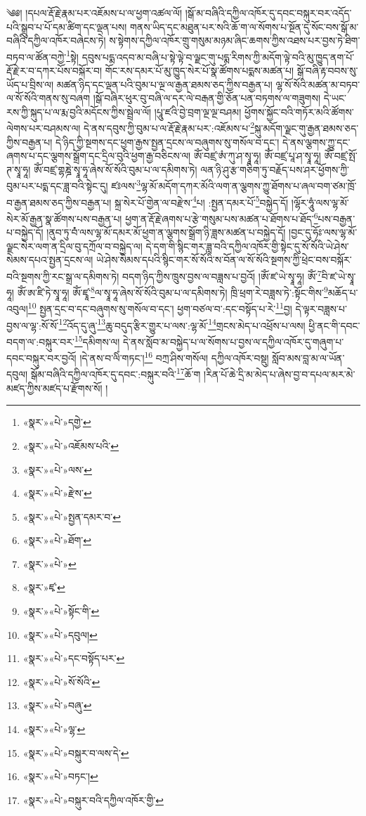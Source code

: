༄༅། །དཔལ་རྡོ་རྗེ་རྣམ་པར་འཇོམས་པ་ལ་ཕྱག་འཚལ་ལོ། །སྒོ་མ་བཞིའི་དཀྱིལ་འཁོར་དུ་དབང་བསྐུར་བར་འདོད་པའི་སྒྲུབ་པ་པོ་དམ་ཚིག་དང་ལྡན་པས། གནས་ཡིད་དང་མཐུན་པར་སའི་ཆོ་ག་ལ་སོགས་པ་སྔོན་དུ་སོང་བས་སྒོ་མ་བཞིའི་དཀྱིལ་འཁོར་བཞེངས་ཏེ། ས་སྟེགས་དཀྱིལ་འཁོར་གྲུ་གསུམ་མཉམ་ཞིང་ཆགས་ཀྱིས་འཐས་པར་བྱས་ཏེ་ཐིག་བཏབ་ལ་ཚོན་བཀྱེ་\footnote{«སྣར་»«པེ་»དགྱེ་}སྟེ། དབུས་པདྨ་འདབ་མ་བཞི་པ་སྟེ་ལྟེ་བ་ལྗང་གུ་པདྨ་རིགས་ཀྱི་མདོག་ལྟེ་བའི་མུ་ཁྱུད་ནག་པོ་རྡོ་རྗེ་ར་བ་དཀར་པོས་བསྐོར་བ། གོང་རས་དམར་པོ་མུ་ཁྱུད་སེར་པོ་སྣ་ཚོགས་པདྨས་མཚན་པ། སྒོ་བཞི་རྟ་བབས་སུ་ཡོད་པ་བྲིས་ལ། མཚན་ཉིད་དང་ལྡན་པའི་བུམ་པ་ལྔ་ལ་རྒྱན་ཐམས་ཅད་ཀྱིས་བརྒྱན་པ། ལྷ་སོ་སོའི་མཚན་མ་བཏབ་ལ་སོ་སོའི་གནས་སུ་བཞག །སྒོ་བཞིར་ཕུར་བུ་བཞི་ལ་དར་ལེ་བརྒན་གྱི་ཅོན་པན་བཏགས་ལ་གཟུགས། དེ་ཡང་རས་ཀྱི་སྐུད་པ་ལ་རྨ་བྱའི་མདོངས་ཀྱིས་སྦྲེལ་ལོ། །པཱུ་ཛའི་བྱེ་བྲག་ལྔ་ལྔ་བཤམ། ཕྱོགས་སྐྱོང་བའི་གཏོར་མའི་ཚོགས་ལེགས་པར་བཤམས་ལ། དེ་ནས་དབུས་ཀྱི་བུམ་པ་ལ་རྡོ་རྗེ་རྣམ་པར་:འཇོམས་པ་\footnote{«སྣར་»«པེ་»འཇོམས་པའི་}སྐུ་མདོག་ལྗང་གུ་རྒྱན་ཐམས་ཅད་ཀྱིས་བརྒྱན་པ། དེ་ཉིད་ཀྱི་སྔགས་དང་ཕྱག་རྒྱས་སྤྱན་དྲངས་ལ་བཞུགས་སུ་གསོལ་བ་དང་། དེ་ནས་ལྕགས་ཀྱུ་དང་ཞགས་པ་དང་ལྕགས་སྒྲོག་དང་དྲིལ་བུའི་ཕྱག་རྒྱ་བཅིངས་ལ། ཨོཾ་བཛྲ་ཨཾ་ཀུ་ཤ་སྭཱ་ཧཱ། ཨོཾ་བཛྲ་པཱ་ཤ་སྭཱ་ཧཱ། ཨོཾ་བཛྲ་སྤོ་ཊ་སྭཱ་ཧཱ། ཨོཾ་བཛྲ་གྷཎྜེ་སྭཱ་ཧཱ་ཞེས་སོ་སོའི་བུམ་པ་ལ་དམིགས་ཏེ། ལན་ཉི་ཤུ་རྩ་གཅིག་ཏུ་བརྗོད་པས་ཤར་ཕྱོགས་ཀྱི་བུམ་པར་པདྨ་དང་ཟླ་བའི་སྟེང་དུ། ཛཿལས་\footnote{«སྣར་»«པེ་»ལས་}ལྷ་མོ་མདོག་དཀར་མོའི་ལག་ན་ལྕགས་ཀྱུ་ཐོགས་པ་ཞལ་བག་ཙམ་ཁྲོ་བ་རྒྱན་ཐམས་ཅད་ཀྱིས་བརྒྱན་པ། སྐྲ་སེར་པོ་གྱེན་ལ་བརྫེས་\footnote{«སྣར་»«པེ་»རྫེས་}པ། :སྤྱན་དམར་པོ་\footnote{«སྣར་»«པེ་»སྤྱན་དམར་བ་}བསྐྱེད་དོ། །ལྷོར་ཧཱུཾ་ལས་ལྷ་མོ་སེར་མོ་རྒྱན་སྣ་ཚོགས་པས་བརྒྱན་པ། ཕྱག་ན་རྡོ་རྗེ་ཞགས་པ་རྩེ་གསུམ་པས་མཚན་པ་ཐོགས་པ་ཐོད་\footnote{«སྣར་»«པེ་»ཐོག་}པས་བརྒྱན་པ་བསྐྱེད་དོ། །ནུབ་ཏུ་བཾཾ་ལས་ལྷ་མོ་དམར་མོ་ཕྱག་ན་ལྕགས་སྒྲོག་ཉི་ཟླས་མཚན་པ་བསྐྱེད་དོ། །བྱང་དུ་ཧོཿ་ལས་ལྷ་མོ་ལྗང་སེར་ལག་ན་དྲིལ་བུ་དཀྲོལ་བ་བསྐྱེད་ལ། དེ་དག་གི་སྙིང་གར་ཟླ་བའི་དཀྱིལ་འཁོར་གྱི་སྟེང་དུ་སོ་སོའི་ཡེ་ཤེས་སེམས་དཔའ་སྤྱན་དྲངས་ལ། ཡེ་ཤེས་སེམས་དཔའི་སྙིང་གར་སོ་སོའི་ས་བོན་ལ་སོ་སོའི་སྔགས་ཀྱི་ཕྲེང་བས་བསྐོར་བའི་སྔགས་ཀྱི་རང་སྒྲ་ལ་དམིགས་ཏེ། བདག་ཉིད་ཀྱིས་ཁྲུས་བྱས་ལ་བཟླས་པ་བྱའོ། །ཨོཾ་ཛ་ཡེ་སྭཱ་ཧཱ། ཨོཾ་\footnote{«སྣར་»«པེ་»}བི་ཛ་ཡེ་སྭཱ་ཧཱ། ཨོཾ་ཨ་ཛི་ཏེ་སྭཱ་ཧཱ། ཨོཾ་ཛྭཱ་\footnote{«སྣར་»ཛྭ་}ལ་སྭཱ་ཧཱ་ཞེས་སོ་སོའི་བུམ་པ་ལ་དམིགས་ཏེ། ཁྲི་ཕྲག་རེ་བཟླས་ཏེ་:སྟོང་གིས་\footnote{«སྣར་»«པེ་»སྟོང་གི་}མཆོད་པ་འབུལ།\footnote{«སྣར་»«པེ་»དབུལ།} སྤྱན་དྲང་བ་དང་བཞུགས་སུ་གསོལ་བ་དང་། ཕྱག་བཙལ་བ་:དང་བསྟོད་པ་རེ་\footnote{«སྣར་»«པེ་»དང་བསྟོད་པར་}བྱ། དེ་ལྟར་བཟླས་པ་བྱས་ལ་ལྷ་:སོ་སོ་\footnote{«སྣར་»«པེ་»སོ་སོའི་}འོད་དུ་ཞུ་\footnote{«སྣར་»«པེ་»བཞུ་}ཆུ་བདུད་རྩིར་གྱུར་པ་ལས་:ལྷ་མོ་\footnote{«སྣར་»«པེ་»ལྷ་}གྲངས་མེད་པ་འཕྲོས་པ་ལས། ཕྱི་ནང་གི་དབང་བདག་ལ་:བསྐུར་བར་\footnote{«སྣར་»«པེ་»བསྐུར་བ་ལས་དེ་}དམིགས་ལ། དེ་ནས་སློབ་མ་བསྐྱེད་པ་ལ་སོགས་པ་བྱས་ལ་དཀྱིལ་འཁོར་དུ་གཞུག་པ་དབང་བསྐུར་བར་བྱའོ། །དེ་ནས་བ་ལིཾ་གཏང་།\footnote{«སྣར་»«པེ་»བཏང་།} བཀྲ་ཤིས་གསོལ། དཀྱིལ་འཁོར་བསྡུ། སློབ་མས་བླ་མ་ལ་ཡོན་དབུལ། སྒོམ་བཞིའི་དཀྱིལ་འཁོར་དུ་དབང་:བསྐུར་བའི་\footnote{«སྣར་»«པེ་»བསྐུར་བའི་དཀྱིལ་འཁོར་གྱི་}ཆོ་ག །རིན་པོ་ཆེ་དྲི་མ་མེད་པ་ཞེས་བྱ་བ་དཔལ་མར་མེ་མཛད་ཀྱིས་མཛད་པ་རྫོགས་སོ། ། 